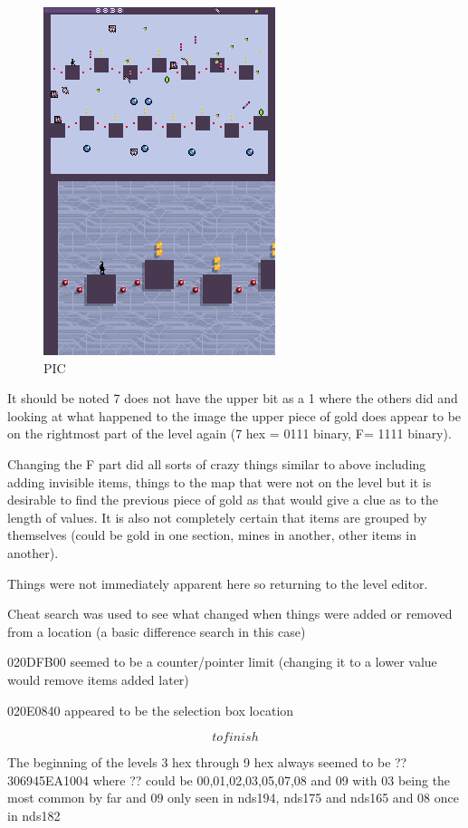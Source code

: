 \documentclass[
]{book}
\begin{document}
\begin{figure}
\centering
\includegraphics{images/185_home_fast6191_romhackingguide_unrenamed_fil___rs_romhackingguideleveleditingworkedNplus18.png}
\caption{PIC}
\end{figure}

It should be noted 7 does not have the upper bit as a 1 where the others did and looking at what happened to the image the upper piece of gold does appear to be on the rightmost part of the level again (7 hex = 0111 binary, F= 1111 binary).

Changing the F part did all sorts of crazy things similar to above including adding invisible items, things to the map that were not on the level but it is desirable to find the previous piece of gold as that would give a clue as to the length of values. It is also not completely certain that items are grouped by themselves (could be gold in one section, mines in another, other items in another).

Things were not immediately apparent here so returning to the level editor.

Cheat search was used to see what changed when things were added or removed from a location (a basic difference search in this case)

020DFB00 seemed to be a counter/pointer limit (changing it to a lower value would remove items added later)

020E0840 appeared to be the selection box location

\[to finish\]

The beginning of the levels 3 hex through 9 hex always seemed to be ??306945EA1004 where ?? could be 00,01,02,03,05,07,08 and 09 with 03 being the most common by far and 09 only seen in nds194, nds175 and nds165 and 08 once in nds182
\end{document}
